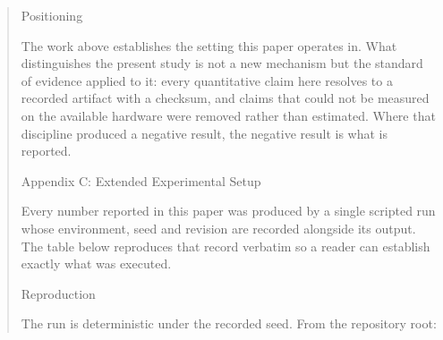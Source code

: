 \documentclass[10pt,twocolumn,letterpaper]{article}
\begin{document}
\begin{quote}
{ Positioning

The work above establishes the setting this paper operates in. What distinguishes the present study is not a new mechanism but the standard of evidence applied to it: every quantitative claim here resolves to a recorded artifact with a checksum, and claims that could not be measured on the available hardware were removed rather than estimated. Where that discipline produced a negative result, the negative result is what is reported.



 Appendix C: Extended Experimental Setup

Every number reported in this paper was produced by a single scripted run whose environment, seed and revision are recorded alongside its output. The table below reproduces that record verbatim so a reader can establish exactly what was executed.
\begin{table}[htbp]
\centering
{}
\end{table}

 Reproduction

The run is deterministic under the recorded seed. From the repository root:}
\end{quote}
\end{document}
